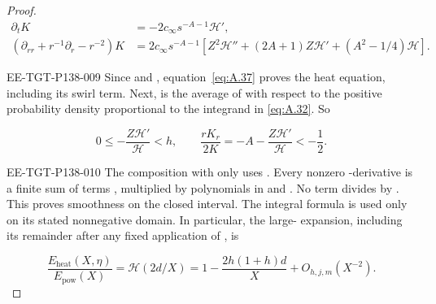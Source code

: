 \begin{proof}
\[\begin{aligned}
 \partial_tK&=-2c_\infty s^{-A-1}\mathcal H',\\
 (\partial_{rr}+r^{-1}\partial_r-r^{-2})K
 &=2c_\infty s^{-A-1}
   [Z^2\mathcal H''+(2A+1)Z\mathcal H'+(A^2-1/4)\mathcal H].
\end{aligned}
\]
\begin{EESegment}{EE-TGT-P138-009}
Since  and
, equation~\eqref{eq:A.37} proves the heat equation, including its swirl
term. Next,  is the average of
 with respect to the positive probability density proportional to the integrand in
\eqref{eq:A.32}. So
\end{EESegment}
\[
 0\leq-\frac{Z\mathcal H'}{\mathcal H}<h,
 \qquad
 \frac{rK_r}{2K}=-A-\frac{Z\mathcal H'}{\mathcal H}<-\frac12.
\]
\begin{EESegment}{EE-TGT-P138-010}
The composition with  only uses
. Every nonzero -derivative is a finite sum of terms
, multiplied by polynomials in
 and . No term divides by
. This proves smoothness on the closed interval. The integral formula is used only on its
stated nonnegative domain. In particular, the large- expansion, including its remainder
after any fixed application of , is
\end{EESegment}
\begin{equation}
 \frac{E_{\mathrm{heat}}(X,\eta)}{E_{\mathrm{pow}}(X)}
 =\mathcal H(2d/X)=1-\frac{2h(1+h)d}{X}+O_{h,j,m}(X^{-2}).
 \tag{A.38}\label{eq:A.38}
\end{equation}
\end{proof}
